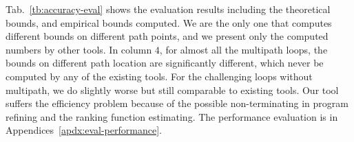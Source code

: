 Tab.~\ref{tb:accuracy-eval} shows the evaluation results including the theoretical bounds, and empirical bounds computed.
We are the only one that computes different bounds on different path points,
and we present only the computed numbers by other tools. In column $4$, for almost all the multipath loops, the bounds on different path location are significantly different, which never be computed by any of the existing tools.
For the challenging loops without multipath, we do slightly worse but still comparable to existing tools.
Our tool suffers the efficiency problem because of the possible non-terminating in program refining and the ranking function estimating.
The performance evaluation is in Appendices~\ref{apdx:eval-performance}.
